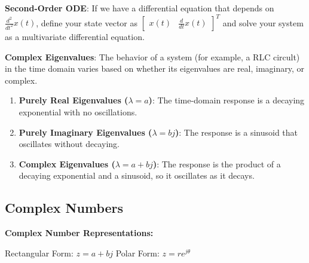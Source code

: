 \textbf{Second-Order ODE}: If we have a differential equation that depends on $\frac{d^2}{dt^2} x(t)$, define your state vector as $\begin{bmatrix} x(t) & \frac{d}{dt} x(t) \end{bmatrix}^T$ and solve your system as a multivariate differential equation.

\textbf{Complex Eigenvalues}: The behavior of a system (for example, a RLC circult) in the time domain varies based on whether its eigenvalues are real, imaginary, or complex.
\begin{enumerate}
    \item \textbf{Purely Real Eigenvalues ($\lambda = a$)}: The time-domain response is a decaying exponential with no oscillations.
    \item \textbf{Purely Imaginary Eigenvalues ($\lambda = bj$)}: The response is a sinusoid that oscillates without decaying.
    \item \textbf{Complex Eigenvalues ($\lambda = a + bj$)}: The response is the product of a decaying exponential and a sinusoid, so it oscillates as it decays.
\end{enumerate}

\newpage
\subsection*{Complex Numbers}
\textbf{Complex Number Representations:} 

\hspace{2 em} Rectangular Form: $z = a + bj$ \hspace{14em} Polar Form: $z = re^{j\theta}$

